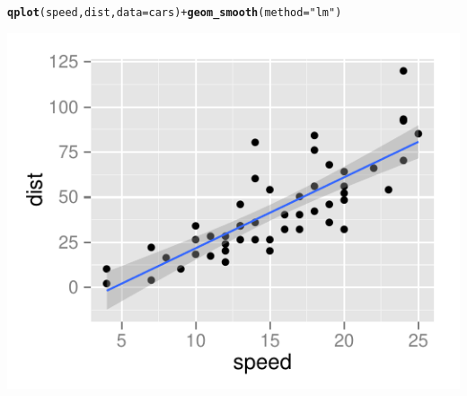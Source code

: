 \documentclass[t]{beamer}\usepackage[]{graphicx}\usepackage[]{color}
\makeatletter
\def\maxwidth{ %
  \ifdim\Gin@nat@width>\linewidth
    \linewidth
  \else
    \Gin@nat@width
  \fi
}
\newcommand{\hlstr}[1]{\textcolor[rgb]{0.192,0.494,0.8}{#1}}%
\newcommand{\hlopt}[1]{\textcolor[rgb]{0,0,0}{#1}}%
\newcommand{\hlstd}[1]{\textcolor[rgb]{0.345,0.345,0.345}{#1}}%
\newcommand{\hlkwc}[1]{\textcolor[rgb]{0.333,0.667,0.333}{#1}}%
\newcommand{\hlkwd}[1]{\textcolor[rgb]{0.737,0.353,0.396}{\textbf{#1}}}%
\newenvironment{kframe}{%
 \def\at@end@of@kframe{}%
 \ifinner\ifhmode%
  \def\at@end@of@kframe{\end{minipage}}%
  \begin{minipage}{\columnwidth}%
 \fi\fi%
 \def\FrameCommand##1{\hskip\@totalleftmargin \hskip-\fboxsep
 \colorbox{shadecolor}{##1}\hskip-\fboxsep
     \hskip-\linewidth \hskip-\@totalleftmargin \hskip\columnwidth}%
 \MakeFramed {\advance\hsize-\width
   \@totalleftmargin\z@ \linewidth\hsize
   \@setminipage}}%
 {\par\unskip\endMakeFramed%
 \at@end@of@kframe}
\newenvironment{knitrout}{}{} %
\makeatother
\begin{document}
\begin{frame}[fragile]
  \frametitle{}
\begin{knitrout}\footnotesize
{}\color{fgcolor}\begin{kframe}
\begin{alltt}
\hlkwd{qplot}\hlstd{(speed, dist,} \hlkwc{data} \hlstd{= cars)} \hlopt{+} \hlkwd{geom_smooth}\hlstd{(}\hlkwc{method} \hlstd{=} \hlstr{"lm"}\hlstd{)}
\end{alltt}
\end{kframe}

{\centering \includegraphics[width=\maxwidth]{figure/cars_plot} 

}



\end{knitrout}

\end{frame}

\end{document}
